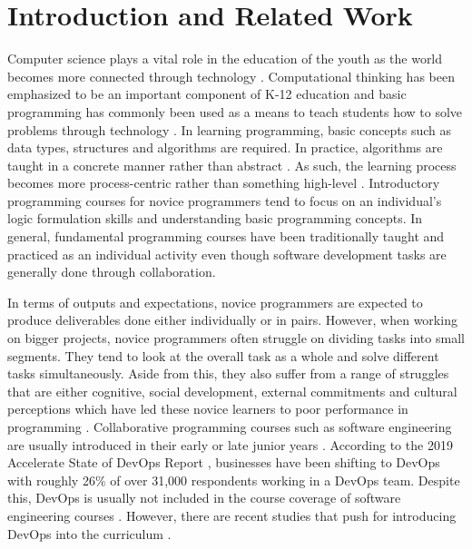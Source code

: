 \documentclass{sigchi}
\begin{document}
\section{Introduction and Related Work}
Computer science plays a vital role in the education of the youth as the world becomes more connected through technology \cite{yadav2016}. Computational thinking has been emphasized to be an important component of K-12 education \cite{mcclelland_grata_2018, yadav2016} and basic programming has commonly been used as a means to teach students how to solve problems through technology \cite{lye_koh_2014}. In learning programming, basic concepts such as data types, structures and algorithms are required. In practice, algorithms are taught in a concrete manner rather than abstract \cite{mccarthygame}. As such, the learning process becomes more process-centric rather than something high-level \cite{teague2014longitudinal}. Introductory programming courses for novice programmers tend to focus on an individual's logic formulation skills and understanding basic programming concepts. In general, fundamental programming courses have been traditionally taught and practiced as an individual activity even though software development tasks are generally done through collaboration. 

In terms of outputs and expectations, novice programmers are expected to produce deliverables done either individually or in pairs. However, when working on bigger projects, novice programmers often struggle on dividing tasks into small segments. They tend to look at the overall task as a whole and solve different tasks simultaneously. Aside from this, they also suffer from a range of struggles that are either cognitive, social development, external commitments and cultural perceptions which have led these novice learners to poor performance in programming \cite{teague2008collaborative}. Collaborative programming courses such as software engineering are usually introduced in their early or late junior years \cite{bass2016software}. According to the 2019 Accelerate State of DevOps Report \cite{forsgren_smith_humble_frazelle_2019}, businesses have been shifting to DevOps with roughly 26\% of over 31,000 respondents working in a DevOps team. Despite this, DevOps is usually not included in the course coverage of software engineering courses \cite{bass2016software}. However, there are recent studies that push for introducing DevOps into the curriculum \cite{bruel2019software, jones2018proposal}.
\end{document}
